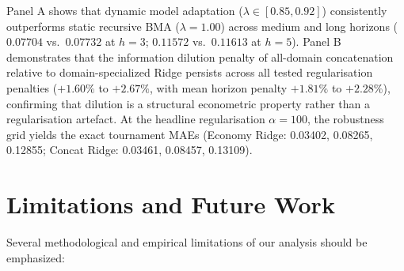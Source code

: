 \documentclass[11pt,a4paper]{article}
\begin{document}

Panel A shows that dynamic model adaptation ($\lambda \in [0.85, 0.92]$) consistently outperforms static recursive BMA ($\lambda = 1.00$) across medium and long horizons ($0.07704$ vs.\ $0.07732$ at $h=3$; $0.11572$ vs.\ $0.11613$ at $h=5$). Panel B demonstrates that the information dilution penalty of all-domain concatenation relative to domain-specialized Ridge persists across all tested regularisation penalties ($+1.60\%$ to $+2.67\%$, with mean horizon penalty $+1.81\%$ to $+2.28\%$), confirming that dilution is a structural econometric property rather than a regularisation artefact. At the headline regularisation $\alpha = 100$, the robustness grid yields the exact tournament MAEs (Economy Ridge: 0.03402, 0.08265, 0.12855; Concat Ridge: 0.03461, 0.08457, 0.13109).



\section{Limitations and Future Work}
\label{sec:limitations}

Several methodological and empirical limitations of our analysis should be emphasized:
\end{document}
